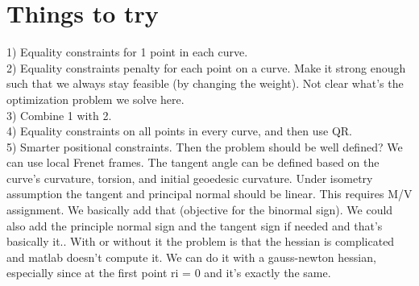 \documentclass{article}
\theoremstyle{definition}
\begin{document}
\section{Things to try}
1) Equality constraints for 1 point in each curve.\\
2) Equality constraints penalty for each point on a curve. Make it strong enough such that we always stay feasible (by changing the weight). Not clear what's the optimization problem we solve here. \\
3) Combine 1 with 2. \\
4) Equality constraints on all points in every curve, and then use QR. \\
5) Smarter positional constraints. Then the problem should be well defined? We can use local Frenet frames. The tangent angle can be defined based on the curve's curvature, torsion, and initial geoedesic curvature. Under isometry assumption the tangent and principal normal should be linear. This requires M/V assignment. We basically add that (objective for the binormal sign). We could also add the principle normal sign and the tangent sign if needed and that's basically it.. With or without it the problem is that the hessian is complicated and matlab doesn't compute it. We can do it with a gauss-newton hessian, especially since at the first point ri = 0 and it's exactly the same.


%
%
\end{document}

